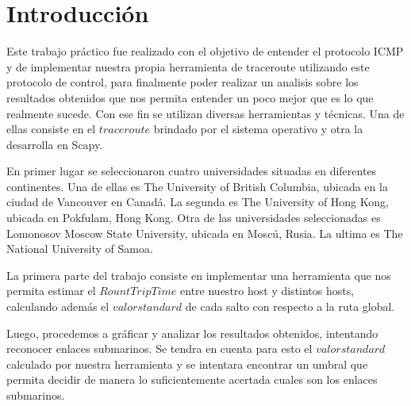 \section{Introducci\'on}

Este trabajo pr\'actico fue realizado con el objetivo de entender el protocolo ICMP y de implementar nuestra propia herramienta de traceroute utilizando este protocolo de control, para finalmente poder realizar un analisis sobre los resultados obtenidos que nos permita entender un poco mejor que es lo que realmente sucede.
Con ese fin se utilizan diversas herramientas y técnicas. Una de ellas consiste en el $traceroute$ brindado por el sistema operativo y otra la desarrolla en Scapy. 

En primer lugar se seleccionaron cuatro universidades situadas en diferentes continentes. Una de ellas 
es The University of British Columbia, ubicada en la ciudad de Vancouver en Canadá. La segunda es The University of Hong Kong, ubicada en Pokfulam, Hong Kong. Otra de las universidades seleccionadas es Lomonosov Moscow State University, ubicada en Moscú, Rusia. La ultima es The National University of Samoa.

La primera parte del trabajo consiste en implementar una herramienta que nos permita estimar el $Rount Trip Time$ entre nuestro host y distintos hosts, calculando adem\'as el $valor standard$ de  cada salto con respecto a la ruta global.

Luego, procedemos a gr\'aficar y analizar los resultados obtenidos, intentando reconocer enlaces submarinos. Se tendra en cuenta para esto el $valor standard$ calculado por nuestra herramienta y se intentara encontrar un umbral que permita decidir de manera lo suficientemente acertada cuales son los enlaces submarinos.